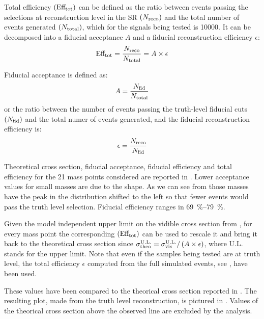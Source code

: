 Total efficiency $\left(\text{Eff}_\textup{tot}\right)$ can be defined as the ratio between events passing the selections at reconstruction level in the SR $\left(N_\textup{reco}\right)$ and the total number of events generated $\left(N_\textup{total}\right)$, which for the signals being tested is \num{10000}. It can be decomposed into a fiducial acceptance $A$ and a fiducial reconstruction efficiency $\epsilon$:
\begin{equation}
	\text{Eff}_\textup{tot}=\frac{N_\textup{reco}}{N_\textup{total}}=A\times\epsilon
\end{equation}

Fiducial acceptance is defined as:
\begin{equation}
	A=\frac{N_\textup{fid}}{N_\textup{total}}
	\label{eqn:accfid}
\end{equation}
or the ratio between the number of events passing the truth-level fiducial cuts $\left(N_\textup{fid}\right)$ and the total numer of events generated, and the fiducial reconstruction efficiency is:
\begin{equation}
	\epsilon=\frac{N_\textup{reco}}{N_\textup{fid}}
	\label{eqn:efffid}
\end{equation}

Theoretical cross section, fiducial acceptance, fiducial efficiency and total efficiency for the \num{21} mass points considered are reported in \Tab{\ref{tab:eff}}. Lower acceptance values for small masses are due to the \met shape. As we can see from \Fig{\ref{fig:validation}} those masses have the peak in the \met distribution shifted to the left so that fewer events would pass the truth level selection. Fiducial efficiency ranges in \SIrange{69}{79}{\percent}.

Given the model independent upper limit on the vidible cross section from \Tab{\ref{table.results.exclxsec.pval.upperlimit.SR}}, for every mass point the corresponding $\left(\text{Eff}_\textup{tot}\right)$ can be used to rescale it and bring it back to the theoretical cross section since $\sigma_\textup{theo}^\textup{U.L.}=\sigma_\textup{vis}^\textup{U.L.}/\left(A\times\epsilon\right)$, where U.L. stands for the \sv upper limit. Note that even if the samples being tested are at truth level, the total efficiency $\epsilon$ computed from the full simulated events, see \Sect{\ref{sec:full}}, have been used.

These values have been compared to the theorical cross section reported in \Tab{\ref{tab:eff}}. The resulting plot, made from the truth level reconstruction, is pictured in \Fig{\ref{subfig:exclMI}}. Values of the theorical cross section above the observed line are excluded by the analysis.

